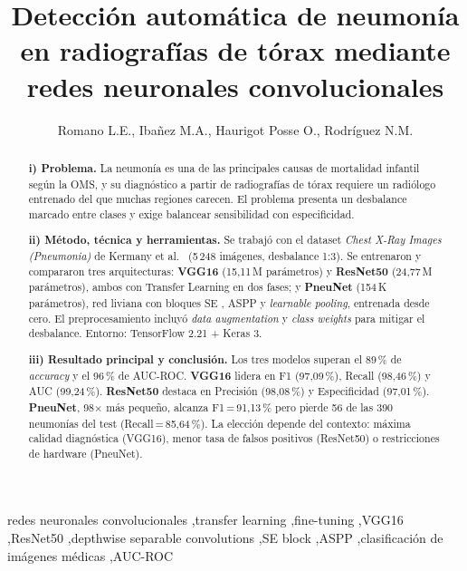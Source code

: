 \documentclass[1p,12pt]{elsarticle}
\newcommand{\autor}[1]{\author{#1}}
\newcommand{\catedra}[1]{\address{#1}}
\begin{document}
\begin{frontmatter}

\title{Detección automática de neumonía en radiografías de tórax mediante redes neuronales convolucionales}

\autor{Romano L.E., Ibañez M.A., Haurigot Posse O., Rodríguez N.M.}

\catedra{Cátedra de Inteligencia Artificial, Ingeniería en Sistemas de Información}

\begin{abstract}
\textbf{i) Problema.} La neumonía es una de las principales causas de mortalidad infantil según la OMS, y su diagnóstico a partir de radiografías de tórax requiere un radiólogo entrenado del que muchas regiones carecen. El problema presenta un desbalance marcado entre clases y exige balancear sensibilidad con especificidad.

\textbf{ii) Método, técnica y herramientas.} Se trabajó con el dataset \textit{Chest X-Ray Images (Pneumonia)} de Kermany et al.\ \cite{kermany2018} (5\,248 imágenes, desbalance 1:3). Se entrenaron y compararon tres arquitecturas: \textbf{VGG16} \cite{simonyan2014} (15,11\,M parámetros) y \textbf{ResNet50} \cite{he2015} (24,77\,M parámetros), ambos con Transfer Learning en dos fases; y \textbf{PneuNet} \cite{saranyaraj2025} (154\,K parámetros), red liviana con bloques SE \cite{hu2018}, ASPP \cite{chen2017} y \textit{learnable pooling}, entrenada desde cero. El preprocesamiento incluyó \textit{data augmentation} y \textit{class weights} para mitigar el desbalance. Entorno: TensorFlow 2.21 + Keras 3.

\textbf{iii) Resultado principal y conclusión.} Los tres modelos superan el 89\,\% de \textit{accuracy} y el 96\,\% de AUC-ROC. \textbf{VGG16} lidera en F1 (97,09\,\%), Recall (98,46\,\%) y AUC (99,24\,\%). \textbf{ResNet50} destaca en Precisión (98,08\,\%) y Especificidad (97,01\,\%). \textbf{PneuNet}, 98$\times$ más pequeño, alcanza F1\,=\,91,13\,\% pero pierde 56 de las 390 neumonías del test (Recall\,=\,85,64\,\%). La elección depende del contexto: máxima calidad diagnóstica (VGG16), menor tasa de falsos positivos (ResNet50) o restricciones de hardware (PneuNet).
\end{abstract}

\begin{keyword}
redes neuronales convolucionales \sep transfer learning \sep fine-tuning \sep VGG16 \sep ResNet50 \sep depthwise separable convolutions \sep SE block \sep ASPP \sep clasificación de imágenes médicas \sep AUC-ROC
\end{keyword}

\end{frontmatter}
\end{document}
